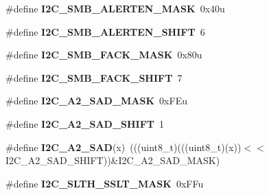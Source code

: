 \begin{DoxyCompactItemize}
\item 
\#define {\bfseries I2\+C\+\_\+\+S\+M\+B\+\_\+\+A\+L\+E\+R\+T\+E\+N\+\_\+\+M\+A\+SK}~0x40u\hypertarget{group__I2C__Register__Masks_ga23b35683fd53d9982486462740d577c8}{}\label{group__I2C__Register__Masks_ga23b35683fd53d9982486462740d577c8}

\item 
\#define {\bfseries I2\+C\+\_\+\+S\+M\+B\+\_\+\+A\+L\+E\+R\+T\+E\+N\+\_\+\+S\+H\+I\+FT}~6\hypertarget{group__I2C__Register__Masks_gab3807b572e12675922212a4ccfaf9327}{}\label{group__I2C__Register__Masks_gab3807b572e12675922212a4ccfaf9327}

\item 
\#define {\bfseries I2\+C\+\_\+\+S\+M\+B\+\_\+\+F\+A\+C\+K\+\_\+\+M\+A\+SK}~0x80u\hypertarget{group__I2C__Register__Masks_ga6c32b35c6a034b2d36c8341e41e1f5e0}{}\label{group__I2C__Register__Masks_ga6c32b35c6a034b2d36c8341e41e1f5e0}

\item 
\#define {\bfseries I2\+C\+\_\+\+S\+M\+B\+\_\+\+F\+A\+C\+K\+\_\+\+S\+H\+I\+FT}~7\hypertarget{group__I2C__Register__Masks_ga8818be9583854e197aa6f7197d42e825}{}\label{group__I2C__Register__Masks_ga8818be9583854e197aa6f7197d42e825}

\item 
\#define {\bfseries I2\+C\+\_\+\+A2\+\_\+\+S\+A\+D\+\_\+\+M\+A\+SK}~0x\+F\+Eu\hypertarget{group__I2C__Register__Masks_ga953881ff63411be620fa173f27ab4efa}{}\label{group__I2C__Register__Masks_ga953881ff63411be620fa173f27ab4efa}

\item 
\#define {\bfseries I2\+C\+\_\+\+A2\+\_\+\+S\+A\+D\+\_\+\+S\+H\+I\+FT}~1\hypertarget{group__I2C__Register__Masks_gad1c31a37087b37cb76faeade10a4fbd6}{}\label{group__I2C__Register__Masks_gad1c31a37087b37cb76faeade10a4fbd6}

\item 
\#define {\bfseries I2\+C\+\_\+\+A2\+\_\+\+S\+AD}(x)~(((uint8\+\_\+t)(((uint8\+\_\+t)(x))$<$$<$I2\+C\+\_\+\+A2\+\_\+\+S\+A\+D\+\_\+\+S\+H\+I\+FT))\&I2\+C\+\_\+\+A2\+\_\+\+S\+A\+D\+\_\+\+M\+A\+SK)\hypertarget{group__I2C__Register__Masks_gadb02a0d0b664b563e9f18a9a4d90fb8f}{}\label{group__I2C__Register__Masks_gadb02a0d0b664b563e9f18a9a4d90fb8f}

\item 
\#define {\bfseries I2\+C\+\_\+\+S\+L\+T\+H\+\_\+\+S\+S\+L\+T\+\_\+\+M\+A\+SK}~0x\+F\+Fu\hypertarget{group__I2C__Register__Masks_gaeef081c4825bc9248b218f4c6ee70f86}{}\label{group__I2C__Register__Masks_gaeef081c4825bc9248b218f4c6ee70f86}


\end{DoxyCompactItemize}
